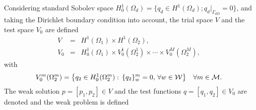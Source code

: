 Considering standard Sobolev space $H^1_0(\Omega_d)=\big\{q_d\in H^1(\Omega_d); q_d|_{\Gamma_{dD}}=0\big\}$,
and taking the Dirichlet boundary condition into account,
the trial space $V$ and the test space $V_0$ are defined
\begin{eqnarray}
  V &=& H^1(\Omega_1)\times H^1(\Omega_2), \label{eqn:prim_weak_space_V}\\
  V_0 &=& H^1_0(\Omega_1)\times V^1_0(\Omega^1_2) \times\cdots\times V^M_0(\Omega^M_2), \label{eqn:prim_weak_space_V0}
\end{eqnarray}
with
\begin{equation}
  V^m_0(\Omega^m_2) = \big\{q_2\in H^1_0(\Omega^m_2):\, \{q_2\}^m_w=0,\,\forall w\in\mathcal{W}\big\}
  \quad \forall m\in\mathcal{M}. \label{eqn:prim_weak_space_Vm0}
\end{equation}
%
The weak solution $p=[p_1,p_2]\in V$ and the test functions $q=[q_1,q_2]\in V_0$ are denoted
and the weak problem is defined

